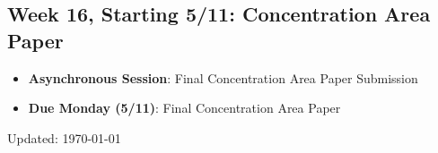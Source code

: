 \documentclass[11pt]{article}     %
\begin{document}
\subsection*{Week 16, Starting 5/11: Concentration Area Paper}
\begin{itemize}
    \item \textbf{Asynchronous Session}: Final Concentration Area Paper Submission
    \item \textbf{Due Monday (5/11)}: Final Concentration Area Paper
\end{itemize}


\newpage

\singlespace


\vspace{1cm}
\begin{flushright}
Updated: \today
\end{flushright}
\end{document}
